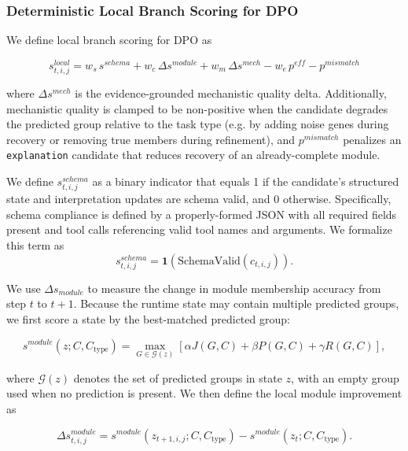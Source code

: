 \documentclass[thesis,letterpaper,12pt]{utthesis}
\begin{document}
\subsubsection{Deterministic Local Branch Scoring for DPO}
We define local branch scoring for DPO as 

\begin{equation}\label{eqn:local-reward}
    s^{local}_{t,i,j} = w_s\, s^{schema} + w_c\, \Delta s^{module} + w_m\, \Delta s^{mech} - w_e\, p^{eff} - p^{mismatch}
\end{equation}

where $\Delta s^{mech}$ is the evidence-grounded mechanistic quality delta. Additionally, mechanistic quality is clamped to be non-positive when the candidate degrades the predicted group relative to the task type (e.g. by adding noise genes during recovery or removing true members during refinement), and $p^{mismatch}$ penalizes an \texttt{explanation} candidate that reduces recovery of an already-complete module.

We define $s^{schema}_{t,i,j}$ as a binary indicator that equals 1 if the candidate's structured state and interpretation updates are schema valid, and 0 otherwise. Specifically, schema compliance is defined by a properly-formed JSON with all required fields present and tool calls referencing valid tool names and arguments. We formalize this term as
\begin{equation}\label{eqn:schema-score}
   s^{schema}_{t,i,j} = \mathbf{1}(\text{SchemaValid}(c_{t,i,j})).
\end{equation}

We use $\Delta s_{module}$ to measure the change in module membership accuracy from step $t$ to $t+1$. Because the runtime state may contain multiple predicted groups, we first score a state by the best-matched predicted group:

\begin{equation}\label{eqn:module-state-score}
    s^{module}(z; C, C_{\text{type}}) =
    \max_{G \in \mathcal{G}(z)}
    \left[
        \alpha J(G, C) + \beta P(G, C) + \gamma R(G, C)
    \right],
\end{equation}

where $\mathcal{G}(z)$ denotes the set of predicted groups in state $z$, with an empty group used when no prediction is present. We then define the local module improvement as

\begin{equation}\label{eqn:module-score}
        \Delta s^{module}_{t,i,j}
    =
    s^{module}(z_{t+1,i,j}; C, C_{\text{type}})
    -
    s^{module}(z_t; C, C_{\text{type}}).
\end{equation}
\end{document}
